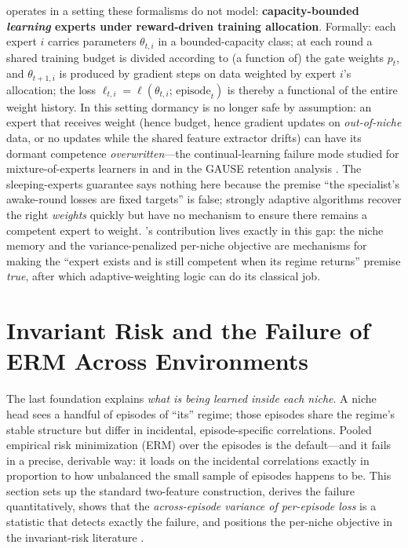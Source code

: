 \begin{remark}
\label{rem:dd1-gap}
\nm{} operates in a setting these formalisms do not model:
\textbf{capacity-bounded \emph{learning} experts under reward-driven
training allocation}. Formally: each expert $i$ carries parameters
$\theta_{t,i}$ in a bounded-capacity class; at each round a shared training
budget is divided according to (a function of) the gate weights $p_t$, and
$\theta_{t+1, i}$ is produced by gradient steps on data weighted by expert
$i$'s allocation; the loss $\ell_{t,i} = \ell(\theta_{t,i};\,
\text{episode}_t)$ is thereby a functional of the entire weight history. In
this setting dormancy is no longer safe by assumption: an expert that
receives weight (hence budget, hence gradient updates on
\emph{out-of-niche} data, or no updates while the shared feature extractor
drifts) can have its dormant competence \emph{overwritten}---the
continual-learning failure mode studied for mixture-of-experts learners in
\cite{li2024moecl} and in the GAUSE retention analysis \cite{li2026gause}.
The sleeping-experts guarantee says nothing here because the premise ``the
specialist's awake-round losses are fixed targets'' is false; strongly
adaptive algorithms recover the right \emph{weights} quickly but have no
mechanism to ensure there remains a competent expert to weight. \nm{}'s
contribution lives exactly in this gap: the niche memory and the
variance-penalized per-niche objective are mechanisms for making the
``expert exists and is still competent when its regime returns'' premise
\emph{true}, after which adaptive-weighting logic can do its classical job.
\end{remark}

\section{Invariant Risk and the Failure of ERM Across Environments}
\label{sec:dd1-invariance}

The last foundation explains \emph{what is being learned inside each niche}.
A niche head sees a handful of episodes of ``its'' regime; those episodes
share the regime's stable structure but differ in incidental, episode-specific
correlations. Pooled empirical risk minimization (ERM) over the episodes is
the default---and it fails in a precise, derivable way: it loads on the
incidental correlations exactly in proportion to how unbalanced the small
sample of episodes happens to be. This section sets up the standard
two-feature construction, derives the failure quantitatively, shows that the
\emph{across-episode variance of per-episode loss} is a statistic that detects
exactly the failure, and positions the \nm{} per-niche objective in the
invariant-risk literature \cite{arjovsky2019irm, krueger2021rex,
peters2016causal}.

